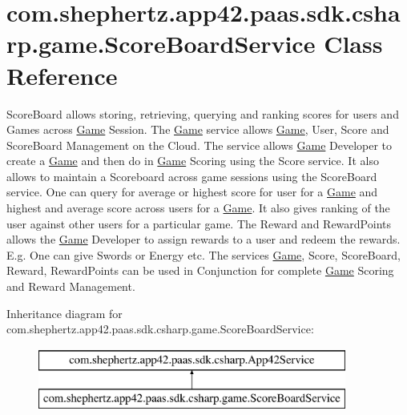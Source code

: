 \hypertarget{classcom_1_1shephertz_1_1app42_1_1paas_1_1sdk_1_1csharp_1_1game_1_1_score_board_service}{\section{com.\+shephertz.\+app42.\+paas.\+sdk.\+csharp.\+game.\+Score\+Board\+Service Class Reference}
\label{classcom_1_1shephertz_1_1app42_1_1paas_1_1sdk_1_1csharp_1_1game_1_1_score_board_service}
}


Score\+Board allows storing, retrieving, querying and ranking scores for users and Games across \hyperlink{classcom_1_1shephertz_1_1app42_1_1paas_1_1sdk_1_1csharp_1_1game_1_1_game}{Game} Session. The \hyperlink{classcom_1_1shephertz_1_1app42_1_1paas_1_1sdk_1_1csharp_1_1game_1_1_game}{Game} service allows \hyperlink{classcom_1_1shephertz_1_1app42_1_1paas_1_1sdk_1_1csharp_1_1game_1_1_game}{Game}, User, Score and Score\+Board Management on the Cloud. The service allows \hyperlink{classcom_1_1shephertz_1_1app42_1_1paas_1_1sdk_1_1csharp_1_1game_1_1_game}{Game} Developer to create a \hyperlink{classcom_1_1shephertz_1_1app42_1_1paas_1_1sdk_1_1csharp_1_1game_1_1_game}{Game} and then do in \hyperlink{classcom_1_1shephertz_1_1app42_1_1paas_1_1sdk_1_1csharp_1_1game_1_1_game}{Game} Scoring using the Score service. It also allows to maintain a Scoreboard across game sessions using the Score\+Board service. One can query for average or highest score for user for a \hyperlink{classcom_1_1shephertz_1_1app42_1_1paas_1_1sdk_1_1csharp_1_1game_1_1_game}{Game} and highest and average score across users for a \hyperlink{classcom_1_1shephertz_1_1app42_1_1paas_1_1sdk_1_1csharp_1_1game_1_1_game}{Game}. It also gives ranking of the user against other users for a particular game. The Reward and Reward\+Points allows the \hyperlink{classcom_1_1shephertz_1_1app42_1_1paas_1_1sdk_1_1csharp_1_1game_1_1_game}{Game} Developer to assign rewards to a user and redeem the rewards. E.\+g. One can give Swords or Energy etc. The services \hyperlink{classcom_1_1shephertz_1_1app42_1_1paas_1_1sdk_1_1csharp_1_1game_1_1_game}{Game}, Score, Score\+Board, Reward, Reward\+Points can be used in Conjunction for complete \hyperlink{classcom_1_1shephertz_1_1app42_1_1paas_1_1sdk_1_1csharp_1_1game_1_1_game}{Game} Scoring and Reward Management.  


Inheritance diagram for com.\+shephertz.\+app42.\+paas.\+sdk.\+csharp.\+game.\+Score\+Board\+Service\+:\begin{figure}[H]
\begin{center}
\leavevmode
\includegraphics[height=2.000000cm]{classcom_1_1shephertz_1_1app42_1_1paas_1_1sdk_1_1csharp_1_1game_1_1_score_board_service}
\end{center}
\end{figure}
